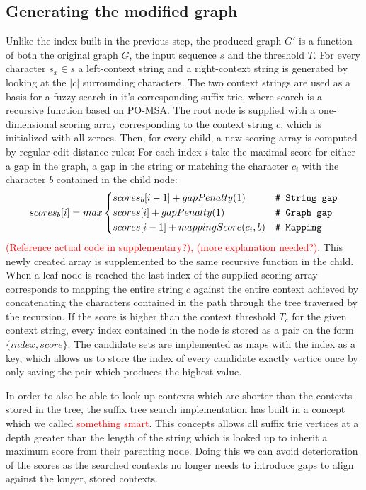 \documentclass[thesis.tex]{subfiles}
\begin{document}
\subsection{Generating the modified graph}
Unlike the index built in the previous step, the produced graph $G'$ is a function of both the original graph $G$, the input sequence $s$ and the threshold $T$. For every character $s_x \in s$ a left-context string and a right-context string is generated by looking at the $|c|$ surrounding characters. The two context strings are used as a basis for a fuzzy search in it's corresponding suffix trie, where search is a recursive function based on PO-MSA. The root node is supplied with a one-dimensional scoring array corresponding to the context string $c$, which is initialized with all zeroes. Then, for every child, a new scoring array is computed by regular edit distance rules: For each index $i$ take the maximal score for either a gap in the graph, a gap in the string or matching the character $c_i$ with the character $b$ contained in the child node:
\begin{equation}
  scores_b[i] = max \begin{dcases}
    scores_b[i - 1] + gapPenalty(1) & \text{\texttt{\# String gap}}\\
    scores[i] + gapPenalty(1) & \text{\texttt{\# Graph gap}}\\
    scores[i - 1] + mappingScore(c_i, b) & \text{\texttt{\# Mapping}}\\
  \end{dcases}
\end{equation} 
\textcolor{red}{(Reference actual code in supplementary?), (more explanation needed?)}. This newly created array is supplemented to the same recursive function in the child. When a leaf node is reached the last index of the supplied scoring array corresponds to mapping the entire string $c$ against the entire context achieved by concatenating the characters contained in the path through the tree traversed by the recursion. If the score is higher than the context threshold $T_c$ for the given context string, every index contained in the node is stored as a pair on the form $\{index, score\}$. The candidate sets are implemented as maps with the index as a key, which allows us to store the index of every candidate exactly vertice once by only saving the pair which produces the highest value.\\
\par\noindent
In order to also be able to look up contexts which are shorter than the contexts stored in the tree, the suffix tree search implementation has built in a concept which we called \textcolor{red}{something smart}. This concepts allows all suffix trie vertices at a depth greater than the length of the string which is looked up to inherit a maximum score from their parenting node. Doing this we can avoid deterioration of the scores as the searched contexts no longer needs to introduce gaps to align against the longer, stored contexts.
\end{document}
